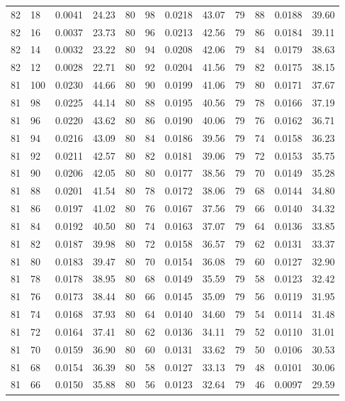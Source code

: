 \begin{tabular}{llll|llll|llll}
82 & 18 & 0.0041 & 24.23 & 80 & 98 & 0.0218 & 43.07 & 79 & 88 & 0.0188 & 39.60\\
82 & 16 & 0.0037 & 23.73 & 80 & 96 & 0.0213 & 42.56 & 79 & 86 & 0.0184 & 39.11\\
82 & 14 & 0.0032 & 23.22 & 80 & 94 & 0.0208 & 42.06 & 79 & 84 & 0.0179 & 38.63\\
82 & 12 & 0.0028 & 22.71 & 80 & 92 & 0.0204 & 41.56 & 79 & 82 & 0.0175 & 38.15\\
81 & 100 & 0.0230 & 44.66 & 80 & 90 & 0.0199 & 41.06 & 79 & 80 & 0.0171 & 37.67\\
81 & 98 & 0.0225 & 44.14 & 80 & 88 & 0.0195 & 40.56 & 79 & 78 & 0.0166 & 37.19\\
81 & 96 & 0.0220 & 43.62 & 80 & 86 & 0.0190 & 40.06 & 79 & 76 & 0.0162 & 36.71\\
81 & 94 & 0.0216 & 43.09 & 80 & 84 & 0.0186 & 39.56 & 79 & 74 & 0.0158 & 36.23\\
81 & 92 & 0.0211 & 42.57 & 80 & 82 & 0.0181 & 39.06 & 79 & 72 & 0.0153 & 35.75\\
81 & 90 & 0.0206 & 42.05 & 80 & 80 & 0.0177 & 38.56 & 79 & 70 & 0.0149 & 35.28\\
81 & 88 & 0.0201 & 41.54 & 80 & 78 & 0.0172 & 38.06 & 79 & 68 & 0.0144 & 34.80\\
81 & 86 & 0.0197 & 41.02 & 80 & 76 & 0.0167 & 37.56 & 79 & 66 & 0.0140 & 34.32\\
81 & 84 & 0.0192 & 40.50 & 80 & 74 & 0.0163 & 37.07 & 79 & 64 & 0.0136 & 33.85\\
81 & 82 & 0.0187 & 39.98 & 80 & 72 & 0.0158 & 36.57 & 79 & 62 & 0.0131 & 33.37\\
81 & 80 & 0.0183 & 39.47 & 80 & 70 & 0.0154 & 36.08 & 79 & 60 & 0.0127 & 32.90\\
81 & 78 & 0.0178 & 38.95 & 80 & 68 & 0.0149 & 35.59 & 79 & 58 & 0.0123 & 32.42\\
81 & 76 & 0.0173 & 38.44 & 80 & 66 & 0.0145 & 35.09 & 79 & 56 & 0.0119 & 31.95\\
81 & 74 & 0.0168 & 37.93 & 80 & 64 & 0.0140 & 34.60 & 79 & 54 & 0.0114 & 31.48\\
81 & 72 & 0.0164 & 37.41 & 80 & 62 & 0.0136 & 34.11 & 79 & 52 & 0.0110 & 31.01\\
81 & 70 & 0.0159 & 36.90 & 80 & 60 & 0.0131 & 33.62 & 79 & 50 & 0.0106 & 30.53\\
81 & 68 & 0.0154 & 36.39 & 80 & 58 & 0.0127 & 33.13 & 79 & 48 & 0.0101 & 30.06\\
81 & 66 & 0.0150 & 35.88 & 80 & 56 & 0.0123 & 32.64 & 79 & 46 & 0.0097 & 29.59\\

\end{tabular}
